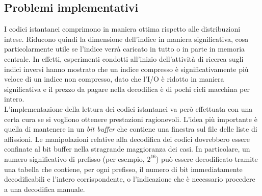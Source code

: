 \subsection{Problemi implementativi}
I codici istantanei comprimono in maniera ottima rispetto alle distribuzioni intese. Riducono quindi la dimensione dell'indice in maniera significativa, cosa particolarmente utile se l'indice verrà caricato in tutto o in parte in memoria centrale. In effetti, esperimenti condotti all'inizio dell'attività di ricerca sugli indici inversi hanno mostrato che un indice compresso è significativamente più veloce di un indice non compresso, dato che l'I/O è ridotto in maniera significativa e il prezzo da pagare nella decodifica è di pochi cicli macchina per intero.\\
L'implementazione della lettura dei codici istantanei va però effettuata con una certa cura se si vogliono ottenere prestazioni ragionevoli. L'idea più importante è quella di mantenere in un \textit{bit buffer} che contiene una finestra sul file delle liste di affissioni. Le manipolazioni relative alla decodifica dei codici dovrebbero essere confinate al bit buffer nella stragrande maggioranza dei casi. In particolare, un numero significativo di prefisso (per esempio, $2^{16}$) può essere decodificato tramite una tabella che contiene, per ogni prefisso, il numero di bit immediatamente decodificabili e l'intero corrispondente, o l'indicazione che è necessario procedere a una decodifica manuale.
